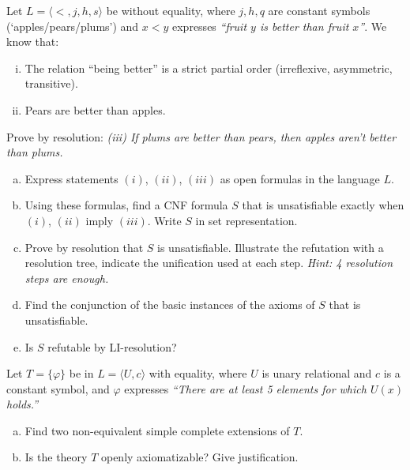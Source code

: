 \begin{problem}

    Let $L=\langle <, j, h, s\rangle$ be without equality, where $j,h,q$ are constant symbols (`apples/pears/plums') and $x < y$ expresses {\it ``fruit $y$ is better than fruit $x$''}. We know that:
    \begin{enumerate}[(i)]\it
        \item The relation ``being better'' is a strict partial order (irreflexive, asymmetric, transitive).
        \item Pears are better than apples.
    \end{enumerate}
    Prove by resolution: \emph{(iii) If plums are better than pears, then apples aren't better than plums.}

    \begin{enumerate}[(a)]
    \item Express statements $(i)$, $(ii)$, $(iii)$ as open formulas in the language $L$.
    \item Using these formulas, find a CNF formula $S$ that is unsatisfiable exactly when $(i)$, $(ii)$ imply $(iii)$. Write $S$ in set representation.
    \item Prove by resolution that $S$ is unsatisfiable. Illustrate the refutation with a resolution tree, indicate the unification used at each step. {\it Hint: 4 resolution steps are enough.}
    \item Find the conjunction of the basic instances of the axioms of $S$ that is unsatisfiable.
    \item Is $S$ refutable by LI-resolution?
    \end{enumerate}

\end{problem}


\begin{problem}

    Let $T=\{\varphi\}$ be in $L=\langle U, c \rangle$ with equality, where $U$ is unary relational and $c$ is a constant symbol, and $\varphi$ expresses \emph{``There are at least 5 elements for which $U(x)$ holds.''}
    \begin{enumerate}[(a)]
        \item Find two non-equivalent simple complete extensions of $T$.
        \item Is the theory $T$ openly axiomatizable? Give justification.
    \end{enumerate}

\end{problem}


